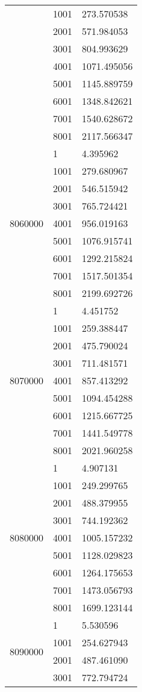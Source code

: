 \begin{table}[htb!]
\begin{tabular}{lll}
 & 1001 & 273.570538 \\
 & 2001 & 571.984053 \\
 & 3001 & 804.993629 \\
 & 4001 & 1071.495056 \\
 & 5001 & 1145.889759 \\
 & 6001 & 1348.842621 \\
 & 7001 & 1540.628672 \\
 & 8001 & 2117.566347 \\
\multirow[c]{9}{*}{8060000} & 1 & 4.395962 \\
 & 1001 & 279.680967 \\
 & 2001 & 546.515942 \\
 & 3001 & 765.724421 \\
 & 4001 & 956.019163 \\
 & 5001 & 1076.915741 \\
 & 6001 & 1292.215824 \\
 & 7001 & 1517.501354 \\
 & 8001 & 2199.692726 \\
\multirow[c]{9}{*}{8070000} & 1 & 4.451752 \\
 & 1001 & 259.388447 \\
 & 2001 & 475.790024 \\
 & 3001 & 711.481571 \\
 & 4001 & 857.413292 \\
 & 5001 & 1094.454288 \\
 & 6001 & 1215.667725 \\
 & 7001 & 1441.549778 \\
 & 8001 & 2021.960258 \\
\multirow[c]{9}{*}{8080000} & 1 & 4.907131 \\
 & 1001 & 249.299765 \\
 & 2001 & 488.379955 \\
 & 3001 & 744.192362 \\
 & 4001 & 1005.157232 \\
 & 5001 & 1128.029823 \\
 & 6001 & 1264.175653 \\
 & 7001 & 1473.056793 \\
 & 8001 & 1699.123144 \\
\multirow[c]{9}{*}{8090000} & 1 & 5.530596 \\
 & 1001 & 254.627943 \\
 & 2001 & 487.461090 \\
 & 3001 & 772.794724 \\

\end{tabular}
\end{table}
